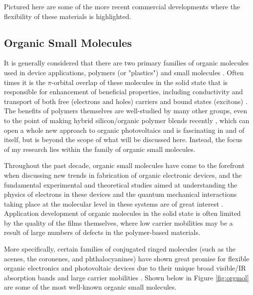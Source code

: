 Pictured here are some of the more recent commercial developments where the flexibility of these materials is highlighted.  







\subsection{Organic Small Molecules} 



It is generally considered that there are two primary families of organic molecules used in device applications, polymers (or "plastics") \cite{Simpson2004} \cite{Duan2011} \cite{Paquin2013} and small molecules \cite{Kelley2004} \cite{Sergeyev2007}  \cite{vanderPoll2012}. Often times it is the $\pi$-orbital overlap of these molecules in the solid state that is responsible for enhancement of beneficial properties, including conductivity and transport of both free (electrons and holes) carriers and bound states (excitons) \cite{Shaw2001} \cite{Facchetti2011}.  The benefits of polymers themselves are well-studied by many other groups, even to the point of making hybrid silicon/organic polymer blends recently \cite{Jeong2012}, which can open a whole new approach to organic photovoltaics and is fascinating in and of itself, but is beyond the scope of what will be discussed here.  Instead, the focus of my research lies within the family of organic small molecules.    



Throughout the past decade, organic small molecules have come to the forefront when discussing new trends in fabrication of organic electronic devices, and the fundamental experimental and theoretical studies aimed at understanding the physics of electrons in these devices and the quantum mechanical interactions taking place at the molecular level in these systems are of great interest \cite{Forrest2004} \cite{Podzorov2010} \cite{Cicoira2013} \cite{Orgiu2014}.  Application development of organic molecules in the solid state is often limited by the quality of the films themselves, where low carrier mobilities may be a result of large numbers of defects in the polymer-based materials\cite{Natali2012}.



More specifically, certain families of conjugated ringed molecules (such as the acenes, the coronenes, and phthalocyanines) have shown great promise for flexible organic electronics and photovoltaic devices due to their unique broad visible/IR absorption bands and large carrier mobilities \cite{Schmidt-Mende2001} \cite{Sergeyev2007} \cite{Ahn2008} \cite{Anthony2006} \cite{Yamagata2011}.  Shown below in Figure \ref{fig:orgmol} are some of the most well-known organic small molecules. 





